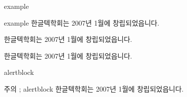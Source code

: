 \documentclass[ aspectratio=169,  10pt,blue,xcolor=pdftex,dvipsnames,table,handout,notes]{beamer}
\begin{document}
		\begin{frame}[t]{example}

			\begin{example} {example}
			한글텍학회는 2007년 1월에 창립되었읍니다.	
			\end{example}

			\begin{example} {}
			한글텍학회는 2007년 1월에 창립되었읍니다.	
			\end{example}

			\begin{example}
			한글텍학회는 2007년 1월에 창립되었읍니다.	
			\end{example}


		\end{frame}


		\begin{frame}[t]{alertblock}

			\begin{alertblock} {주의 ; alertblock}
			한글텍학회는 2007년 1월에 창립되었읍니다.	
			\end{alertblock}

		\end{frame}
\end{document}
